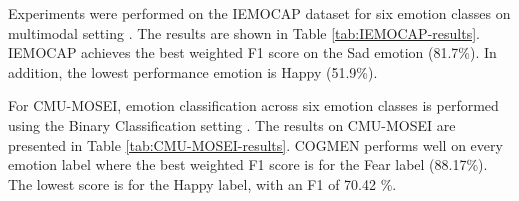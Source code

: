 Experiments were performed on the IEMOCAP dataset for six emotion classes on multimodal setting \cite{HP_Advanced}. The results are shown in Table \ref{tab:IEMOCAP-results}. IEMOCAP achieves the best weighted F1 score on the Sad emotion (81.7\%). In addition, the lowest performance emotion is Happy (51.9\%).
%
\begin{table}[h]
    \caption{Results on the IEMOCAP dataset (6-way). Avg. denotes the weighted average.}
    \centering
    \label{tab:IEMOCAP-results}
\end{table}
%
For CMU-MOSEI, emotion classification across six emotion classes is performed using the Binary Classification setting \cite{COGMEN_joshi-etal-2022-cogmen}. The results on CMU-MOSEI are presented in Table \ref{tab:CMU-MOSEI-results}. COGMEN performs well on every emotion label where the best weighted F1 score is for the Fear label (88.17\%). The lowest score is for the Happy label, with an F1 of 70.42 \%. 
%
\begin{table}[h]
    \caption{Results on the CMU-MOSEI dataset (6-emotion class). Avg. denotes the weighted average.}
    \centering
    \label{tab:CMU-MOSEI-results}
\end{table}
